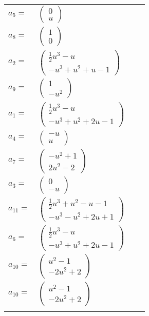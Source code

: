 \documentclass[1p]{elsarticle_modified}
\theoremstyle{definition}
\begin{document}
\begin{tabular}{m{7pt} m{180pt} m{7pt} m{180pt} }
\flushright $a_{5}=$&$\begin{pmatrix}0\\u\end{pmatrix}$ \\
\flushright $a_{8}=$&$\begin{pmatrix}1\\0\end{pmatrix}$ \\
\flushright $a_{2}=$&$\begin{pmatrix}\frac{1}{2} u^3- u\\- u^3+u^2+u-1\end{pmatrix}$ \\
\flushright $a_{9}=$&$\begin{pmatrix}1\\- u^2\end{pmatrix}$ \\
\flushright $a_{1}=$&$\begin{pmatrix}\frac{1}{2} u^3- u\\- u^3+u^2+2 u-1\end{pmatrix}$ \\
\flushright $a_{4}=$&$\begin{pmatrix}- u\\u\end{pmatrix}$ \\
\flushright $a_{7}=$&$\begin{pmatrix}- u^2+1\\2 u^2-2\end{pmatrix}$ \\
\flushright $a_{3}=$&$\begin{pmatrix}0\\- u\end{pmatrix}$ \\
\flushright $a_{11}=$&$\begin{pmatrix}\frac{1}{2} u^3+u^2- u-1\\- u^3- u^2+2 u+1\end{pmatrix}$ \\
\flushright $a_{6}=$&$\begin{pmatrix}\frac{1}{2} u^3- u\\- u^3+u^2+2 u-1\end{pmatrix}$ \\
\flushright $a_{10}=$&$\begin{pmatrix}u^2-1\\-2 u^2+2\end{pmatrix}$\\ \flushright $a_{10}=$&$\begin{pmatrix}u^2-1\\-2 u^2+2\end{pmatrix}$\\&\end{tabular}
\end{document}

